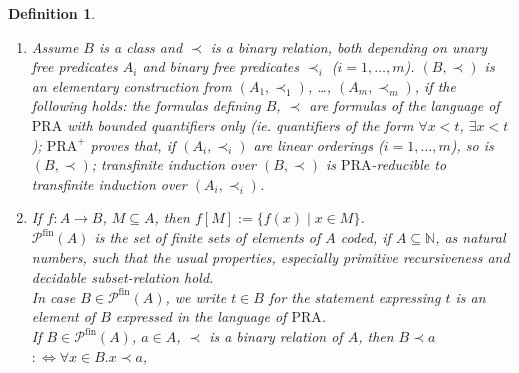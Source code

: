 \documentclass[10pt]{article}
\def \ssubitem#1{\item \label{\actlabel#1} }
\newtheorem {definition} [lemma]{Definition}
\def\all{\forall}
\def\ar{\rightarrow}
\def \Iff{\Leftrightarrow}
\def\nat{\mathbb{N}}
\def\potsetfin{{\mathcal{P}^\mathrm{fin}}}
\def\TI{\mathrm{TI}}
\def\PRA{\mathrm{PRA}}
\def\underlinedef#1{{\it #1}}
\begin{document}
\begin{definition}
{\begin{enumerate}
{$B$}, in short  $\TI_{(A,\prec)}(B)$, is defined as
$\all x \in A(\all y \in A(y \prec x \ar y \in B) \ar x \in B) \ar 
\all x \in A.x \in B$.\\
As in \cite{setzvenedig},
we define $\PRA^+$ as the extension of $\PRA$ by additional
predicates (called free predicates) without having induction over
formulas containing these predicates.
Let $A$ be a class, $\prec$ be a binary relation, both depending on
unary free predicates $A_i$ and binary free predicates $\prec_i$ ($i=1 ,\ldots, n$).
{\it Transfinite induction over $(A,\prec)$ is in ${\mathrm{PRA}}$ reducible to
transfinite induction over $(A_i,\prec_i)$} ($i=1 , \ldots , n$),
in short {\it ${\mathrm{TI}}_{(A,\prec)}$ is ${\mathrm{PRA}}$-reducible to
${\mathrm{TI}}_{(A_i,\prec_i)}$}, if 
there exist $n_i \in \mathbb{N}$, variables $z_{i,j,k}$,
classes $B_{i,j}$ with free variables $\subset 
\{ z_{i,j,1} ,\ldots, z_{i,j,m_{i,j}}\} $, such that
${\mathrm{PRA}^+} \vdash (\bigwedge_{i=1}^n \bigwedge_{j=1}^{n_i}
(\forall z_{ij1} ,\ldots, z_{ijm_{i,j}}.
{\mathrm{TI}}_{(A_i,\prec_i)}(B_{ij} ))
 \rightarrow {\mathrm{TI}}_{(A,\prec)}(Q)$ 
for some free unary predicate $Q$.
\ssubitem {ab} Assume $B$ is a class and 
$\prec$ is a binary relation, both depending on 
unary free predicates $A_i$ and binary free predicates
$\prec_i$ ($i=1 ,\ldots, m$).
$(B,\prec)$ is an {\em elementary construction from
$(A_1,\prec_1)$, \ldots , $(A_m,\prec_m)$}, if the following holds:
the formulas defining $B$, $\prec$ are formulas of the language
of $\PRA$ with bounded quantifiers only
(ie. quantifiers of the form
$\all x< t$, $\exists x<t$);
$\PRA^+$ proves that, if $(A_i,\prec_i)$ are linear 
orderings ($i=1 ,\ldots, m$), so
is $(B,\prec)$;
transfinite induction over $(B,\prec)$ is $\PRA$-reducible to 
transfinite induction over $(A_i,\prec_i)$.
\ssubitem b 
If $f:A \ar B$, $M \subseteq A$, then 
\underlinedef{$f[M]$}$:= \{ f(x) \mid x \in M \} $.\\
\underlinedef{$\potsetfin(A)$} is 
the set of finite sets of elements of $A$ 
coded, if $A \subseteq \nat$, 
as natural numbers, such that the usual properties, especially 
primitive recursiveness and  decidable subset-relation hold.\\
In case $B \in \potsetfin(A)$, we write $t \in B$ for the
statement expressing $t$ is an element of $B$ expressed in
the language of $\PRA$.\\
If $B \in \potsetfin(A)$, $a \in A$, $\prec$ is
a binary relation of $A$, then
\underlinedef{$B \prec a$}$:\Iff \all x \in B.x \prec a$,

\end{enumerate}}
\end{definition}
\end{document}
